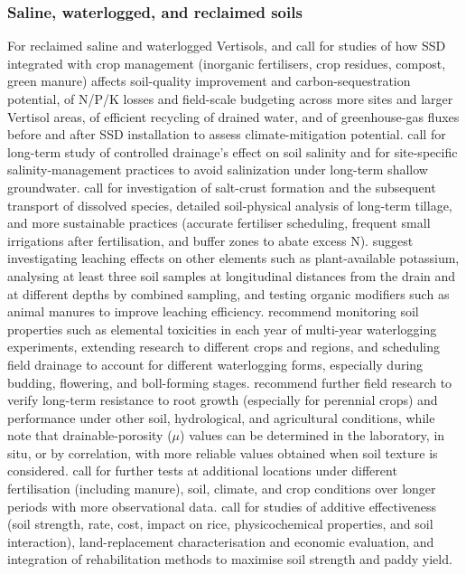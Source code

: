\subsubsection{Saline, waterlogged, and reclaimed soils}

For reclaimed saline and waterlogged Vertisols, \textcite{Mukhopadhyay2023} and \textcite{Mukhopadhyay2023b} call for studies of how SSD integrated with crop management (inorganic fertilisers, crop residues, compost, green manure) affects soil-quality improvement and carbon-sequestration potential, of N/P/K losses and field-scale budgeting across more sites and larger Vertisol areas, of efficient recycling of drained water, and of greenhouse-gas fluxes before and after SSD installation to assess climate-mitigation potential. \textcite{ElGhannam2023} call for long-term study of controlled drainage's effect on soil salinity and for site-specific salinity-management practices to avoid salinization under long-term shallow groundwater. \textcite{Colombani2016} call for investigation of salt-crust formation and the subsequent transport of dissolved species, detailed soil-physical analysis of long-term tillage, and more sustainable practices (accurate fertiliser scheduling, frequent small irrigations after fertilisation, and buffer zones to abate excess N). \textcite{SoltaniGerdefaramarzi2020} suggest investigating leaching effects on other elements such as plant-available potassium, analysing at least three soil samples at longitudinal distances from the drain and at different depths by combined sampling, and testing organic modifiers such as animal manures to improve leaching efficiency. \textcite{Qian2021} recommend monitoring soil properties such as elemental toxicities in each year of multi-year waterlogging experiments, extending research to different crops and regions, and scheduling field drainage to account for different waterlogging forms, especially during budding, flowering, and boll-forming stages. \textcite{Bahçeci2018} recommend further field research to verify long-term resistance to root growth (especially for perennial crops) and performance under other soil, hydrological, and agricultural conditions, while \textcite{Bahceci2008} note that drainable-porosity ($\mu$) values can be determined in the laboratory, in situ, or by correlation, with more reliable values obtained when soil texture is considered. \textcite{Sadhukhan2019} call for further tests at additional locations under different fertilisation (including manure), soil, climate, and crop conditions over longer periods with more observational data. \textcite{Isa2023} call for studies of additive effectiveness (soil strength, rate, cost, impact on rice, physicochemical properties, and soil interaction), land-replacement characterisation and economic evaluation, and integration of rehabilitation methods to maximise soil strength and paddy yield.


